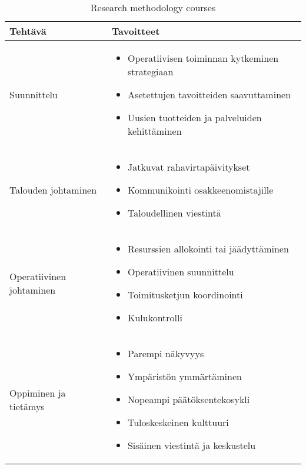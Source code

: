 \documentclass[12pt,a4paper,oneside,pdftex]{report}
\begin{document}
\begin{table}
\begin{tabular}{|p{3cm}|p{10cm}|}
\hline %
\textbf{Tehtävä} & \textbf{Tavoitteet} \\
\hline
Suunnittelu &
\begin{itemize}
\setlength{\itemsep}{0pt}
\item Operatiivisen toiminnan kytkeminen strategiaan
\item Asetettujen tavoitteiden saavuttaminen
\item Uusien tuotteiden ja palveluiden kehittäminen
\end{itemize}
\\
\hline

Talouden johtaminen &
\begin{itemize}
\setlength{\itemsep}{0pt}
\item Jatkuvat rahavirtapäivitykset
\item Kommunikointi osakkeenomistajille
\item Taloudellinen viestintä
\end{itemize}
\\
\hline

Operatiivinen johtaminen &
\begin{itemize}
\setlength{\itemsep}{0pt}
\item Resurssien allokointi tai jäädyttäminen
\item Operatiivinen suunnittelu
\item Toimitusketjun koordinointi
\item Kulukontrolli
\end{itemize}
\\
\hline

Oppiminen ja tietämys &
\begin{itemize}
\setlength{\itemsep}{0pt}
\item Parempi näkyvyys
\item Ympäristön ymmärtäminen
\item Nopeampi päätöksentekosykli
\item Tuloskeskeinen kulttuuri
\item Sisäinen viestintä ja keskustelu
\end{itemize}
\\
\hline
\end{tabular} %
\caption{Research methodology courses}
\label{table:päätehtävät}
\end{table} %
\end{document}

